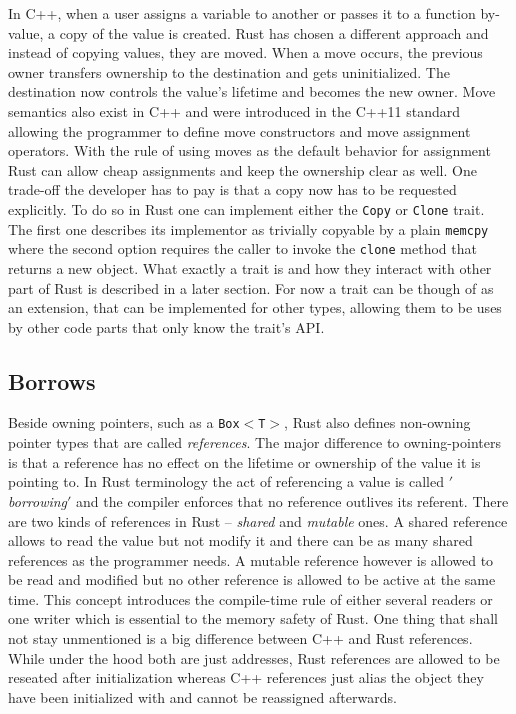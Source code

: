 In C++, when a user assigns a variable to another or passes it to a function by-value, a copy of the value is created. Rust has chosen a different approach and instead of copying values, they are moved. When a move occurs,  the previous owner transfers ownership to the destination and gets uninitialized. The destination now controls the value's lifetime and becomes the new owner. Move semantics also exist in C++ and were introduced in the C++11 standard allowing the programmer to define move constructors and move assignment operators. \cite{CppMove} With the rule of using moves as the default behavior for assignment Rust can allow cheap assignments and keep the ownership clear as well. One trade-off the developer has to pay is that a copy now has to be requested explicitly. To do so in Rust one can implement either the \texttt{Copy} or \texttt{Clone} trait. The first one describes its implementor as trivially copyable by a plain \texttt{memcpy} where the second option requires the caller to invoke the \texttt{clone} method that returns a new object. \cite[Chapter 4. Ownership]{ProRus} What exactly a trait is and how they interact with other part of Rust is described in a later section. For now a trait can be though of as an extension, that can be implemented for other types, allowing them to be uses by other code parts that only know the trait's \ac{API}.

\subsection{Borrows}

Beside owning pointers, such as a \texttt{Box$<$T$>$}, Rust also defines non-owning pointer types that are called \textit{references}. The major difference to owning-pointers is that a reference has no effect on the lifetime or ownership of the value it is pointing to. In Rust terminology the act of referencing a value is called \textit{$'$borrowing$'$} and the compiler enforces that no reference outlives its referent. There are two kinds of references in Rust -- \textit{shared} and \textit{mutable} ones. A shared reference allows to read the value but not modify it and there can be as many shared references as the programmer needs. A mutable reference however is allowed to be read and modified but no other reference is allowed to be active at the same time. This concept introduces the compile-time rule of either several readers or one writer which is essential to the memory safety of Rust. One thing that shall not stay unmentioned is a big difference between C++ and Rust references. While under the hood both are just addresses, Rust references are allowed to be reseated after initialization whereas C++ references just alias the object they have been initialized with and cannot be reassigned afterwards. \cite[Chapter 5. References]{ProRus}

